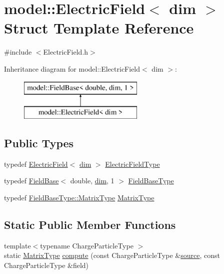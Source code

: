 \hypertarget{structmodel_1_1_electric_field}{}\section{model\+:\+:Electric\+Field$<$ dim $>$ Struct Template Reference}
\label{structmodel_1_1_electric_field}


{\ttfamily \#include $<$Electric\+Field.\+h$>$}

Inheritance diagram for model\+:\+:Electric\+Field$<$ dim $>$\+:\begin{figure}[H]
\begin{center}
\leavevmode
\includegraphics[height=2.000000cm]{structmodel_1_1_electric_field}
\end{center}
\end{figure}
\subsection*{Public Types}
\begin{DoxyCompactItemize}
\item 
typedef \hyperlink{structmodel_1_1_electric_field}{Electric\+Field}$<$ \hyperlink{plot_nd_a_8m_a382f3ca768b275b8d563604f7fc7df73}{dim} $>$ \hyperlink{structmodel_1_1_electric_field_a514813fa907004b5c1fb1f42b4acbe3f}{Electric\+Field\+Type}
\item 
typedef \hyperlink{structmodel_1_1_field_base}{Field\+Base}$<$ double, \hyperlink{plot_nd_a_8m_a382f3ca768b275b8d563604f7fc7df73}{dim}, 1 $>$ \hyperlink{structmodel_1_1_electric_field_a7be4158689bb0a5c8ded48bc18af7ff1}{Field\+Base\+Type}
\item 
typedef \hyperlink{structmodel_1_1_field_base_a2a46afe1dafac6e3d1c95d32fc9a58a3}{Field\+Base\+Type\+::\+Matrix\+Type} \hyperlink{structmodel_1_1_electric_field_a0b11c74a102706cf2bfe5a70be681601}{Matrix\+Type}
\end{DoxyCompactItemize}
\subsection*{Static Public Member Functions}
\begin{DoxyCompactItemize}
\item 
{\footnotesize template$<$typename Charge\+Particle\+Type $>$ }\\static \hyperlink{structmodel_1_1_electric_field_a0b11c74a102706cf2bfe5a70be681601}{Matrix\+Type} \hyperlink{structmodel_1_1_electric_field_a11bcb36ca23c4e5ef64e1dc4b0cb5b9f}{compute} (const Charge\+Particle\+Type \&\hyperlink{plot_network_8m_a6f3223812eea666f1fee426db5c8c563}{source}, const Charge\+Particle\+Type \&field)
\end{DoxyCompactItemize}


